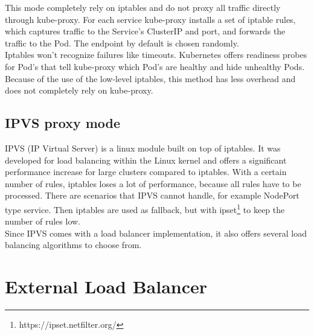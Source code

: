 This mode completely rely on iptables and do not proxy all traffic directly through kube-proxy.
For each service kube-proxy installs a set of iptable rules, which captures traffic to the Service's ClusterIP and port, and forwards the traffic to the Pod.
The endpoint by default is chosen randomly.
\\
Iptables won't recognize failures like timeouts.
Kubernetes offers readiness probes for Pod's that tell kube-proxy which Pod's are healthy and hide unhealthy Pods.
\\
Because of the use of the low-level iptables, this method has less overhead and does not completely rely on kube-proxy.~\cite{KUBERNETES-SERVICE}

\subsection{IPVS proxy mode}

IPVS (IP Virtual Server) is a linux module built on top of iptables.
It was developed for load balancing within the Linux kernel and offers a significant performance increase for large clusters compared to iptables.
With a certain number of rules, iptables loses a lot of performance, because all rules have to be processed.
There are scenarios that IPVS cannot handle, for example NodePort type service.
Then iptables are used as fallback, but with ipset\footnote{https://ipset.netfilter.org/} to keep the number of rules low.
\\
Since IPVS comes with a load balancer implementation, it also offers several load balancing algorithms to choose from.~\cite{KUBERNETES-SERVICE}

\section{External Load Balancer}\label{sec:ExternalLoadBalancer}

